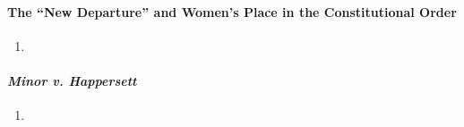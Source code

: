 \paragraph{The ``New Departure'' and Women's Place in the Constitutional 
Order}

\begin{enumerate}
    \item %
\end{enumerate}

\paragraph{\emph{Minor v. Happersett}}

\begin{enumerate}
    \item %
\end{enumerate}
 
